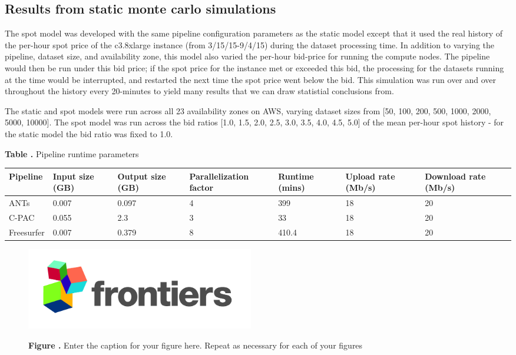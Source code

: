 \documentclass{frontiersSCNS} %
\begin{document}
\subsection{Results from static monte carlo simulations}

The spot model was developed with the same pipeline configuration parameters as the static model except that it used the real history of the per-hour spot price of the c3.8xlarge instance (from 3/15/15-9/4/15) during the dataset processing time. In addition to varying the pipeline, dataset size, and availability zone, this model also varied the per-hour bid-price for running the compute nodes. The pipeline would then be run under this bid price; if the spot price for the instance met or exceeded this bid, the processing for the datasets running at the time would be interrupted, and restarted the next time the spot price went below the bid. This simulation was run over and over throughout the history every 20-minutes to yield many results that we can draw statistial conclusions from.

The static and spot models were run across all 23 availability zones on AWS, varying dataset sizes from [50, 100, 200, 500, 1000, 2000, 5000, 10000]. The spot model was run across the bid ratios [1.0, 1.5, 2.0, 2.5, 3.0, 3.5, 4.0, 4.5, 5.0] of the mean per-hour spot history - for the static model the bid ratio was fixed to 1.0.

\begin{table}[!ht]
\textbf{\label{Tab:03} Table .}{ Pipeline runtime parameters}

\processtable{}
{\begin{tabular}{lllllll}\toprule
        Pipeline & Input size (GB) & Output size (GB) & Parallelization factor & Runtime (mins) & Upload rate (Mb/s) & Download rate (Mb/s)\\\midrule
        ANTs & 0.007 & 0.097 & 4 & 399 & 18 & 20\\
        C-PAC & 0.055 & 2.3 & 3 & 33 & 18 & 20\\
        Freesurfer & 0.007 & 0.379 & 8 & 410.4 & 18 & 20\\
\end{tabular}}{}
\end{table}

% 
\begin{figure}[h!]
\begin{center}
\includegraphics[width=10cm]{logo1}%
\end{center}
 \textbf{\label{fig:01} Figure .}{ Enter the caption for your figure here.  Repeat as  necessary for each of your figures }
\end{figure}
\end{document}
